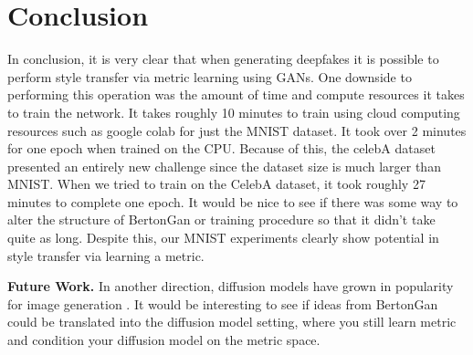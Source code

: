 \documentclass{article}
\begin{document}
\section{Conclusion}

In conclusion, it is very clear that when generating deepfakes it is possible to perform style transfer via metric learning using GANs. One downside to
performing this operation was the amount of time and compute resources it takes to train the network. It takes roughly 10 minutes to train using cloud
computing resources such as google colab for just the MNIST dataset.
It took over 2 minutes for one epoch when trained on the CPU. Because of this, the celebA dataset presented an entirely new challenge since the
dataset size is much larger than MNIST.
When we tried to train on the CelebA dataset, it took roughly 27 minutes to complete one epoch.
It would be nice to see if there was some way to alter the structure of BertonGan or training procedure so that it didn't take quite as long.
Despite this, our MNIST experiments clearly show potential in style transfer via learning a metric.

	{\bf Future Work.} In another direction, diffusion models have grown in popularity for image generation \cite{croitoru2022diffusion}. It would be interesting to see if ideas from BertonGan could be translated into the diffusion model setting, where you still learn metric and condition your diffusion model on the metric space.



\pagebreak



\end{document}
